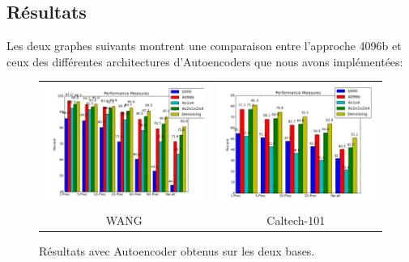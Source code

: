 
\subsection{Résultats}

	Les deux graphes suivants montrent une comparaison entre l'approche 4096b et ceux des différentes architectures d'Autoencoders que nous avons implémentées:

\begin{figure}[H]
\centering
\begin{tabular}{cc}
\centering

\includegraphics[width=9cm]{Figures/results/res-wang2b.png}
&
\includegraphics[width=9cm]{Figures/results/res-caltech2b.png}\\
WANG & Caltech-101\\
\end{tabular}
\caption[comp7]{Résultats avec Autoencoder obtenus sur les deux bases.}
\end{figure}

